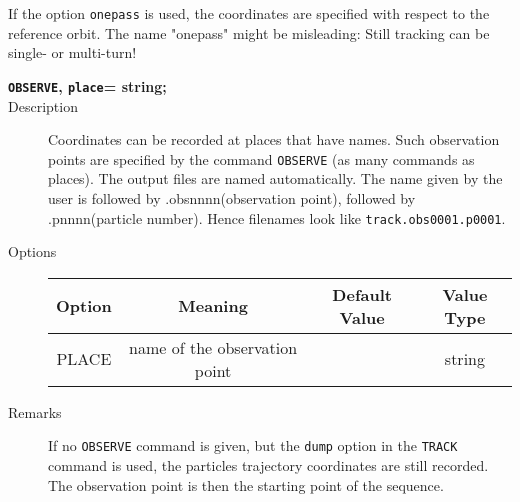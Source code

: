 \begin{description}
\begin{itemize}
                If the option \texttt{onepass} is used, the coordinates are specified with respect 
                to the reference orbit. The name "onepass" might be misleading: Still tracking can be single- or multi-turn!  
                
\end{itemize}

\end{description}
\begin{description}
	\item[\textbf{\texttt{OBSERVE}, \texttt{place}= string;}] 

	\item[Description] 
          Coordinates can be recorded at places that have names.  Such observation points are 
             specified by the command \texttt{OBSERVE} (as many commands as places).
             The output files are named automatically. The name given by the user is followed 
          by .obsnnnn(observation point), followed by .pnnnn(particle number). Hence filenames look like \texttt{track.obs0001.p0001}. 
           
	\item[Options] 
		\text{ \\}	
	
\begin{tabular}{cccc}
\hline 
\textbf{Option} & \textbf{Meaning} & \textbf{Default Value} & \textbf{Value Type} \\ 
\hline
PLACE & name of the observation point &  & string \\ 
\hline

\end{tabular}
	\item[Remarks] 
          If no \texttt{OBSERVE} command is given, but the \texttt{dump} option in the 
          \texttt{TRACK} command is used, the particles trajectory coordinates are still recorded. 
          The observation point is then the starting point of the sequence.
           
\end{description}

